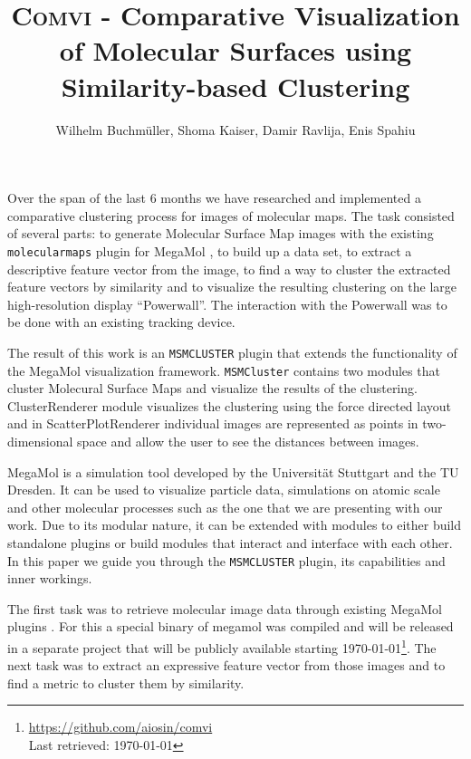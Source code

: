 \documentclass[journal]{vgtc}       %
\title{\textsc{Comvi} - Comparative Visualization of Molecular Surfaces using Similarity-based Clustering}
\author{Wilhelm Buchm\"uller, Shoma Kaiser, Damir Ravlija, Enis Spahiu}
\newcommand{\todo}[1]{\textcolor{red}{\textbf{TODO:} #1}}
\begin{document}

\label{sec:intro}
%
\maketitle
%
Over the span of the last 6 months we  have researched and implemented a comparative clustering  process for images of molecular maps.
The task consisted of several parts: to generate Molecular Surface Map images with the existing \verb|molecularmaps| plugin for MegaMol \cite{MegaMol}, to build up a data set, to extract a descriptive feature vector from the image, to find a way to cluster the extracted  feature vectors by similarity  and to visualize the resulting clustering on the large high-resolution display ``Powerwall''. The interaction with the Powerwall was to be done with  an existing tracking device.

The result of this work is an \verb|MSMCLUSTER| plugin that  extends the functionality of the MegaMol\cite{MegaMol} visualization framework. \verb|MSMCluster| contains two modules that cluster Molecural Surface Maps and visualize the results of the clustering. ClusterRenderer module visualizes the clustering using the force directed layout and in ScatterPlotRenderer individual images are represented as points in two-dimensional space and allow the user to see the distances between images.

MegaMol is a simulation tool developed by the Universit\"at Stuttgart and the TU Dresden. It can be used to visualize particle data, simulations on atomic scale and other molecular processes such as the one that we are presenting with our work. 
Due to its modular nature, it can be extended with modules to either build standalone plugins or build modules that interact and interface with each other.
In this paper we guide you through the \verb|MSMCLUSTER| plugin, its capabilities and inner workings.

The first task was to retrieve molecular image data through existing MegaMol plugins \cite{molecularmaps}. For this a special binary of megamol was compiled and will be released in a separate project that will be publicly available starting \today \footnote{\url{https://github.com/aiosin/comvi}\\ Last retrieved: \today}.
The next task was to extract an expressive feature vector from those images and to find a metric to cluster them by similarity.
\end{document}

